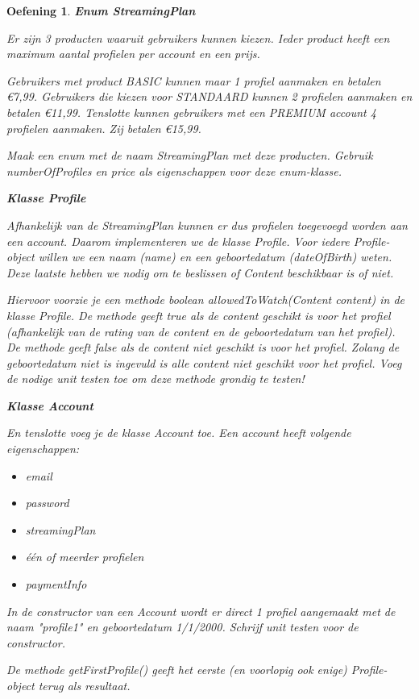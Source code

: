\documentclass{tstextbook}
\newtheorem{envoefening}{Oefening}[chapter]
\newenvironment{oefening}
               {\begin{boxexercise}\begin{envoefening}}
               {\end{envoefening}\end{boxexercise}}
\begin{document}
\begin{oefening}
\textbf{Enum StreamingPlan}

Er zijn 3 producten waaruit gebruikers kunnen kiezen. Ieder product heeft een maximum aantal profielen per account en een prijs. 

Gebruikers met product BASIC kunnen maar 1 profiel aanmaken en betalen €7,99.
Gebruikers die kiezen voor STANDAARD kunnen 2 profielen aanmaken en betalen €11,99.
Tenslotte kunnen gebruikers met een PREMIUM account 4 profielen aanmaken. Zij betalen €15,99.

Maak een enum met de naam StreamingPlan met deze producten. Gebruik numberOfProfiles en price als eigenschappen voor deze enum-klasse. 

\textbf{Klasse Profile}

Afhankelijk van de StreamingPlan kunnen er dus profielen toegevoegd worden aan een account. Daarom implementeren we de klasse Profile. Voor iedere Profile-object willen we een naam (name) en een geboortedatum (dateOfBirth) weten. Deze laatste hebben we nodig om te beslissen of Content beschikbaar is of niet. 

Hiervoor voorzie je een methode \textit{boolean allowedToWatch(Content content)} in de klasse Profile. De methode geeft true als de content geschikt is voor het profiel (afhankelijk van de rating van de content en de geboortedatum van het profiel). 
De methode geeft false als de content niet geschikt is voor het profiel.
Zolang de geboortedatum niet is ingevuld is alle content niet geschikt voor het profiel.
Voeg de nodige unit testen toe om deze methode grondig te testen!

\textbf{Klasse Account}

En tenslotte voeg je de klasse Account toe. Een account heeft volgende eigenschappen:
\begin{itemize}
\item email
\item password
\item streamingPlan
\item \'e\'en of meerder profielen
\item paymentInfo
\end{itemize}

In de constructor van een Account wordt er direct 1 profiel aangemaakt met de naam "profile1" en geboortedatum 1/1/2000. Schrijf unit testen voor de constructor.

De methode getFirstProfile() geeft het eerste (en voorlopig ook enige) Profile-object terug als resultaat. 


\end{oefening}
\end{document}
